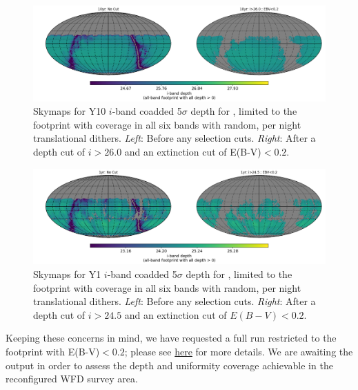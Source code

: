\begin{figure}[H]
	\vspace*{2em}
	\centering\includegraphics[width=\linewidth,trim={30 40 40 40},clip=false]{figures/lss_final_footprint_skymap_pontus_2002_nside256_RandomDitherPerNight_10yr_iband.png}
	\vspace*{1em}
	\caption{Skymaps for Y10 $i$-band coadded 5$\sigma$ depth for , limited to the footprint with coverage in all six bands with random, per night translational dithers. \textit{Left}: Before any selection cuts.  \textit{Right}: After a depth cut of $i>26.0$ and an extinction cut of E(B-V)$<0.2$.}
	\label{fig: skymaps_pontus2002_10yr}
\end{figure}
\begin{figure}[H]
	\vspace*{2em}
	\centering\includegraphics[width=\linewidth,trim={30 40 40 40},clip=false]{figures/lss_final_footprint_skymap_pontus_2002_nside256_RandomDitherPerNight_1yr_iband.png}
	\vspace*{1em}
	\caption{Skymaps for Y1  $i$-band coadded 5$\sigma$ depth for , limited to the footprint with coverage in all six bands with random, per night translational dithers. \textit{Left}: Before any selection cuts.  \textit{Right}: After a depth cut of $i>24.5$ and an extinction cut of $E(B-V)<0.2$.}
	\label{fig: skymaps_pontus2002_1yr}
\end{figure}
 Keeping these concerns in mind, we have requested a full  run restricted to the footprint with E(B-V)$<0.2$; please see \href{https://github.com/LSSTDESC/ObsStrat/tree/issue/5/modify-wfd}{here} for more details. We are awaiting the  output in order to assess the depth and uniformity coverage achievable in the reconfigured WFD survey area.

